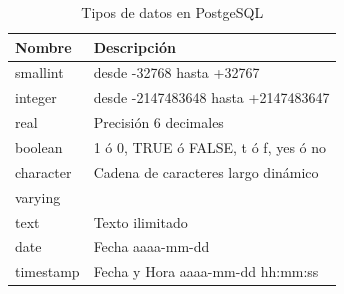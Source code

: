 \documentclass[letterpaper,12pt]{article}
\begin{document}
\begin{table}[!ht]
\caption{Tipos de datos en PostgeSQL}
\begin{center}
\begin{tabular}{|l|l|}
\hline
\textbf{Nombre} & \textbf{Descripción} \\ 
\hline
smallint & desde -32768 hasta +32767\\
\hline
integer & desde -2147483648 hasta +2147483647\\
\hline
real & Precisión 6 decimales\\
\hline
boolean & 1 ó 0, TRUE ó FALSE, t ó f, yes ó no\\
\hline
character & Cadena de caracteres largo dinámico\\
varying &\\
\hline
text & Texto ilimitado\\
\hline
date & Fecha aaaa-mm-dd\\
\hline
timestamp & Fecha y Hora aaaa-mm-dd hh:mm:ss\\
\hline

\end{tabular}
\end{center}
\end{table}

\newpage
\end{document}
